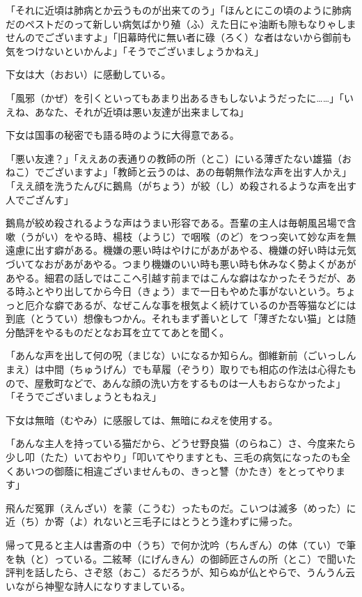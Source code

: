\documentclass{book}
\begin{document}
「それに近頃は肺病とか云うものが出来てのう」「ほんとにこの頃のように肺病だのペストだのって新しい病気ばかり殖（ふ）えた日にゃ油断も隙もなりゃしませんのでございますよ」「旧幕時代に無い者に碌（ろく）な者はないから御前も気をつけないといかんよ」「そうでございましょうかねえ」

下女は大（おおい）に感動している。

「風邪（かぜ）を引くといってもあまり出あるきもしないようだったに\ldots{}\ldots{}」「いえね、あなた、それが近頃は悪い友達が出来ましてね」

下女は国事の秘密でも語る時のように大得意である。

「悪い友達？」「ええあの表通りの教師の所（とこ）にいる薄ぎたない雄猫（おねこ）でございますよ」「教師と云うのは、あの毎朝無作法な声を出す人かえ」「ええ顔を洗うたんびに鵝鳥（がちょう）が絞（し）め殺されるような声を出す人でござんす」

鵝鳥が絞め殺されるような声はうまい形容である。吾輩の主人は毎朝風呂場で含嗽（うがい）をやる時、楊枝（ようじ）で咽喉（のど）をつっ突いて妙な声を無遠慮に出す癖がある。機嫌の悪い時はやけにがあがあやる、機嫌の好い時は元気づいてなおがあがあやる。つまり機嫌のいい時も悪い時も休みなく勢よくがあがあやる。細君の話しではここへ引越す前まではこんな癖はなかったそうだが、ある時ふとやり出してから今日（きょう）まで一日もやめた事がないという。ちょっと厄介な癖であるが、なぜこんな事を根気よく続けているのか吾等猫などには到底（とうてい）想像もつかん。それもまず善いとして「薄ぎたない猫」とは随分酷評をやるものだとなお耳を立ててあとを聞く。

「あんな声を出して何の呪（まじな）いになるか知らん。御維新前（ごいっしんまえ）は中間（ちゅうげん）でも草履（ぞうり）取りでも相応の作法は心得たもので、屋敷町などで、あんな顔の洗い方をするものは一人もおらなかったよ」「そうでございましょうともねえ」

下女は無暗（むやみ）に感服しては、無暗に\emph{ねえ}を使用する。

「あんな主人を持っている猫だから、どうせ野良猫（のらねこ）さ、今度来たら少し叩（たた）いておやり」「叩いてやりますとも、三毛の病気になったのも全くあいつの御蔭に相違ございませんもの、きっと讐（かたき）をとってやります」

飛んだ冤罪（えんざい）を蒙（こうむ）ったものだ。こいつは滅多（めった）に近（ち）か寄（よ）れないと三毛子にはとうとう逢わずに帰った。

帰って見ると主人は書斎の中（うち）で何か沈吟（ちんぎん）の体（てい）で筆を執（と）っている。二絃琴（にげんきん）の御師匠さんの所（とこ）で聞いた評判を話したら、さぞ怒（おこ）るだろうが、知らぬが仏とやらで、うんうん云いながら神聖な詩人になりすましている。
\end{document}
